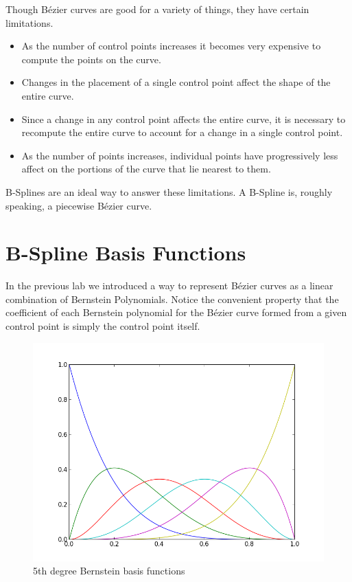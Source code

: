 Though B\'{e}zier curves are good for a variety of things, they have certain limitations.
\begin{itemize}
\item As the number of control points increases it becomes very expensive to compute the points on the curve.
\item Changes in the placement of a single control point affect the shape of the entire curve.
\item Since a change in any control point affects the entire curve, it is necessary to recompute the entire curve to account for a change in a single control point.
\item As the number of points increases, individual points have progressively less affect on the portions of the curve that lie nearest to them.
\end{itemize}

B-Splines are an ideal way to answer these limitations.
A B-Spline is, roughly speaking, a piecewise B\'{e}zier curve.

\section*{B-Spline Basis Functions}

In the previous lab we introduced a way to represent B\'{e}zier curves as a linear combination of Bernstein Polynomials.
Notice the convenient property that the coefficient of each Bernstein polynomial for the B\'{e}zier curve formed from a given control point is simply the control point itself.

\begin{figure}
\includegraphics[width=\textwidth]{bernstein_basis}
\caption{5th degree Bernstein basis functions}
\end{figure}

